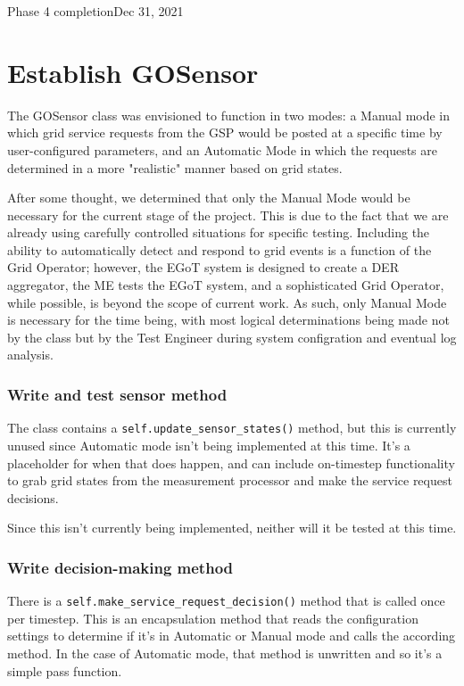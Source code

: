 \begin{entry}{Phase 4 completion}{Dec 31, 2021}
    \section*{Establish GOSensor}
    The GOSensor class was envisioned to function in two modes: a Manual mode in which grid service requests from the
    GSP would be posted at a specific time by user-configured parameters, and an Automatic Mode in which the requests
    are determined in a more "realistic" manner based on grid states.

    After some thought, we determined that only the Manual Mode would be necessary for the current stage of the project.
    This is due to the fact that we are already using carefully controlled situations for specific testing. Including
    the ability to automatically detect and respond to grid events is a function of the Grid Operator; however, the
    EGoT system is designed to create a DER aggregator, the ME tests the EGoT system, and a sophisticated Grid Operator,
    while possible, is beyond the scope of current work. As such, only Manual Mode is necessary for the time being, with
    most logical determinations being made not by the class but by the Test Engineer during system configration and
    eventual log analysis.

    \subsubsection*{Write and test sensor method}
    The class contains a \verb|self.update_sensor_states()| method, but this is currently unused since Automatic mode
    isn't being implemented at this time. It's a placeholder for when that does happen, and can include on-timestep
    functionality to grab grid states from the measurement processor and make the service request decisions.

    Since this isn't currently being implemented, neither will it be tested at this time.

    \subsubsection*{Write decision-making method}
    There is a \verb|self.make_service_request_decision()| method that is called once per timestep. This is an
    encapsulation method that reads the configuration settings to determine if it's in Automatic or Manual mode and
    calls the according method. In the case of Automatic mode, that method is unwritten and so it's a simple pass
    function.


\end{entry}

